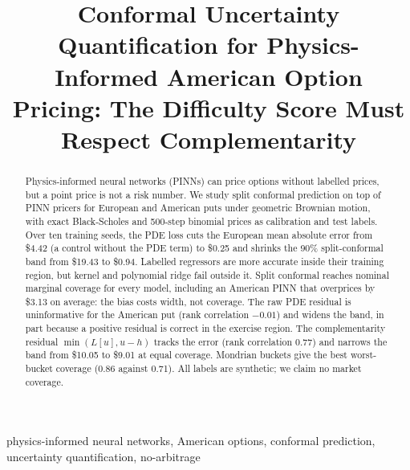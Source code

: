 \documentclass[conference]{IEEEtran}
\newcommand{\usd}{\$}
\begin{document}
\title{Conformal Uncertainty Quantification for Physics-Informed American Option Pricing: The Difficulty Score Must Respect Complementarity}

\author{
}

\maketitle

\begin{abstract}
Physics-informed neural networks (PINNs) can price options without labelled prices, but a point price is not a risk number. We study split conformal prediction on top of PINN pricers for European and American puts under geometric Brownian motion, with exact Black-Scholes and 500-step binomial prices as calibration and test labels. Over ten training seeds, the PDE loss cuts the European mean absolute error from \usd 4.42 (a control without the PDE term) to \usd 0.25 and shrinks the 90\% split-conformal band from \usd 19.43 to \usd 0.94. Labelled regressors are more accurate inside their training region, but kernel and polynomial ridge fail outside it. Split conformal reaches nominal marginal coverage for every model, including an American PINN that overprices by \usd 3.13 on average: the bias costs width, not coverage. The raw PDE residual is uninformative for the American put (rank correlation $-0.01$) and widens the band, in part because a positive residual is correct in the exercise region. The complementarity residual $\min(L[u],u-h)$ tracks the error (rank correlation 0.77) and narrows the band from \usd 10.05 to \usd 9.01 at equal coverage. Mondrian buckets give the best worst-bucket coverage (0.86 against 0.71). All labels are synthetic; we claim no market coverage.
\end{abstract}

\begin{IEEEkeywords}
physics-informed neural networks, American options, conformal prediction, uncertainty quantification, no-arbitrage
\end{IEEEkeywords}
\end{document}
